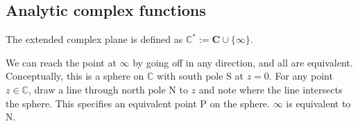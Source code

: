 \documentclass[a4paper]{article}
\begin{document}
\subsection{Analytic complex functions}
\begin{defi}
The extended complex plane is defined as $\mathbb{C}^*:=\mathbf{C}\cup\{\infty\}$.
\end{defi}
\begin{defi}
We can reach the point at $\infty$ by going off in any direction, and all are equivalent. Conceptually, this is a sphere on $\mathbb{C}$ with south pole S at $z=0$. For any point $z\in\mathbb{C}$, draw a line through north pole N to $z$ and note where the line intersects the sphere. This specifies an equivalent point P on the sphere. $\infty$ is equivalent to N.
\end{defi}
\end{document}
